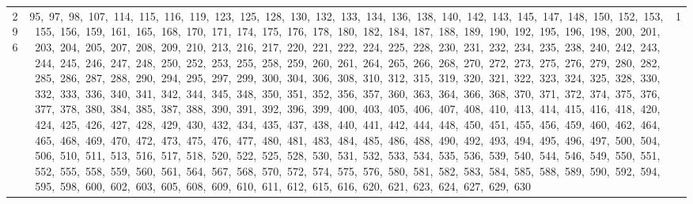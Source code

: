 \begin{longtable}{c|p{}|r}
296 & 95,\ 97,\ 98,\ 107,\ 114,\ 115,\ 116,\ 119,\ 123,\ 125,\ 128,\ 130,\ 132,\ 133,\ 134,\ 136,\ 138,\ 140,\ 142,\ 143,\ 145,\ 147,\ 148,\ 150,\ 152,\ 153,\ 155,\ 156,\ 159,\ 161,\ 165,\ 168,\ 170,\ 171,\ 174,\ 175,\ 176,\ 178,\ 180,\ 182,\ 184,\ 187,\ 188,\ 189,\ 190,\ 192,\ 195,\ 196,\ 198,\ 200,\ 201,\ 203,\ 204,\ 205,\ 207,\ 208,\ 209,\ 210,\ 213,\ 216,\ 217,\ 220,\ 221,\ 222,\ 224,\ 225,\ 228,\ 230,\ 231,\ 232,\ 234,\ 235,\ 238,\ 240,\ 242,\ 243,\ 244,\ 245,\ 246,\ 247,\ 248,\ 250,\ 252,\ 253,\ 255,\ 258,\ 259,\ 260,\ 261,\ 264,\ 265,\ 266,\ 268,\ 270,\ 272,\ 273,\ 275,\ 276,\ 279,\ 280,\ 282,\ 285,\ 286,\ 287,\ 288,\ 290,\ 294,\ 295,\ 297,\ 299,\ 300,\ 304,\ 306,\ 308,\ 310,\ 312,\ 315,\ 319,\ 320,\ 321,\ 322,\ 323,\ 324,\ 325,\ 328,\ 330,\ 332,\ 333,\ 336,\ 340,\ 341,\ 342,\ 344,\ 345,\ 348,\ 350,\ 351,\ 352,\ 356,\ 357,\ 360,\ 363,\ 364,\ 366,\ 368,\ 370,\ 371,\ 372,\ 374,\ 375,\ 376,\ 377,\ 378,\ 380,\ 384,\ 385,\ 387,\ 388,\ 390,\ 391,\ 392,\ 396,\ 399,\ 400,\ 403,\ 405,\ 406,\ 407,\ 408,\ 410,\ 413,\ 414,\ 415,\ 416,\ 418,\ 420,\ 424,\ 425,\ 426,\ 427,\ 428,\ 429,\ 430,\ 432,\ 434,\ 435,\ 437,\ 438,\ 440,\ 441,\ 442,\ 444,\ 448,\ 450,\ 451,\ 455,\ 456,\ 459,\ 460,\ 462,\ 464,\ 465,\ 468,\ 469,\ 470,\ 472,\ 473,\ 475,\ 476,\ 477,\ 480,\ 481,\ 483,\ 484,\ 485,\ 486,\ 488,\ 490,\ 492,\ 493,\ 494,\ 495,\ 496,\ 497,\ 500,\ 504,\ 506,\ 510,\ 511,\ 513,\ 516,\ 517,\ 518,\ 520,\ 522,\ 525,\ 528,\ 530,\ 531,\ 532,\ 533,\ 534,\ 535,\ 536,\ 539,\ 540,\ 544,\ 546,\ 549,\ 550,\ 551,\ 552,\ 555,\ 558,\ 559,\ 560,\ 561,\ 564,\ 567,\ 568,\ 570,\ 572,\ 574,\ 575,\ 576,\ 580,\ 581,\ 582,\ 583,\ 584,\ 585,\ 588,\ 589,\ 590,\ 592,\ 594,\ 595,\ 598,\ 600,\ 602,\ 603,\ 605,\ 608,\ 609,\ 610,\ 611,\ 612,\ 615,\ 616,\ 620,\ 621,\ 623,\ 624,\ 627,\ 629,\ 630 & 1 \\

\end{longtable}
